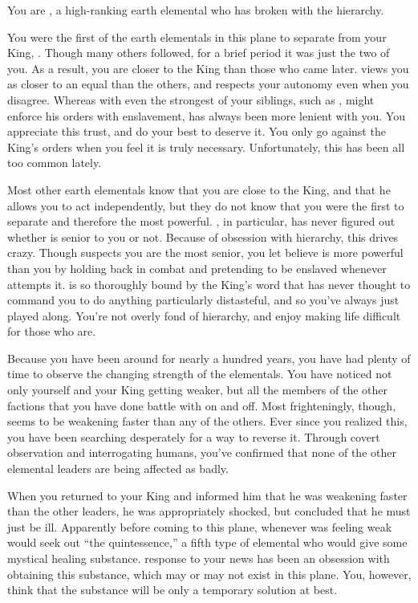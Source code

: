 \documentclass[char]{elementals}
\begin{document}
\name{\cRogue{}}

You are \cRogue{\intro}, a high-ranking earth elemental who has broken with the hierarchy.

You were the first of the earth elementals in this plane to separate from your King, \cEarthKing{}.  Though many others followed, for a brief period it was just the two of you.  As a result, you are closer to the King than those who came later.  \cEarthKing{\They} views you as closer to an equal than the others, and respects your autonomy even when you disagree.  Whereas with even the strongest of your siblings, such as \cLoyal{\intro}, \cEarthKing{} might enforce his orders with enslavement, \cEarthKing{\they} has always been more lenient with you.  You appreciate this trust, and do your best to deserve it.  You only go against the King's orders when you feel it is truly necessary.  Unfortunately, this has been all too common lately.

Most other earth elementals know that you are close to the King, and that he allows you to act independently, but they do not know that you were the first to separate and therefore the most powerful.  \cLoyal{}, in particular, has never figured out whether \cLoyal{\they} is senior to you or not.  Because of \cLoyal{\their} obsession with hierarchy, this drives \cLoyal{\them} crazy.  Though \cLoyal{\they} suspects you are the most senior, you let \cLoyal{\them} believe \cLoyal{\they} is more powerful than you by holding back in combat and pretending to be enslaved whenever \cLoyal{\they} attempts it.  \cLoyal{} is so thoroughly bound by the King's word that \cLoyal{\they} has never thought to command you to do anything particularly distasteful, and so you've always just played along.  You're not overly fond of hierarchy, and enjoy making life difficult for those who are.

Because you have been around for nearly a hundred years, you have had plenty of time to observe the changing strength of the elementals.  You have noticed not only yourself and your King getting weaker, but all the members of the other factions that you have done battle with on and off.  Most frighteningly, though, \cEarthKing{} seems to be weakening faster than any of the others.  Ever since you realized this, you have been searching desperately for a way to reverse it.  Through covert observation and interrogating humans, you've confirmed that none of the other elemental leaders are being affected as badly.

When you returned to your King and informed him that he was weakening faster than the other leaders, he was appropriately shocked, but concluded that he must just be ill.  Apparently before coming to this plane, whenever \cEarthKing{\they} was feeling weak \cEarthKing{\they} would seek out ``the quintessence,'' a fifth type of elemental who would give \cEarthKing{\them} some mystical healing substance.  \cEarthKing{\Their} response to your news has been an obsession with obtaining this substance, which may or may not exist in this plane.  You, however, think that the substance will be only a temporary solution at best.
\end{document}
